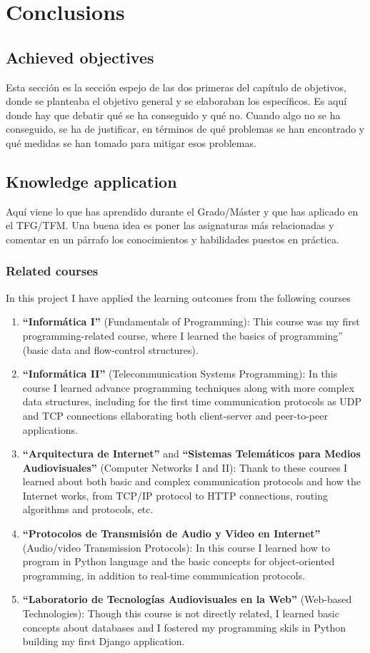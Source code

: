 \documentclass[a4paper, 12pt]{book}
\begin{document}
\chapter{Conclusions}
\label{sec:conclusions}
\section{Achieved objectives}
\label{sec:achieved-objectives}
Esta sección es la sección espejo de las dos primeras del capítulo de objetivos,
donde se planteaba el objetivo general y se elaboraban los específicos.
Es aquí donde hay que debatir qué se ha conseguido y qué no. Cuando algo no
se ha conseguido, se ha de justificar, en términos de qué problemas se han
encontrado y qué medidas se han tomado para mitigar esos problemas.
\section{Knowledge application}
\label{sec:knowledge-application}
Aquí viene lo que has aprendido durante el Grado/Máster y que has aplicado
en el TFG/TFM. Una buena idea es poner las asignaturas más relacionadas y
comentar en un párrafo los conocimientos y habilidades puestos en práctica.
\subsection{Related courses}
In this project I have applied the learning outcomes from the following courses
\begin{enumerate}
  \item \textbf{``Informática I''} (Fundamentals of Programming): This course was my first programming-related course,
  where I learned the basics of programming'' (basic data and flow-control structures).
  \item \textbf{``Informática II''} (Telecommunication Systems Programming): In this course I learned advance programming
  techniques along with more complex data structures, including for the first time communication protocols as UDP and TCP connections
  ellaborating both client-server and peer-to-peer applications.
  \item \textbf{``Arquitectura de Internet''} and \textbf{``Sistemas Telemáticos para Medios Audiovisuales''} (Computer Networks I and II):
  Thank to these courses I learned about both basic and complex communication protocols and how the Internet works,
  from TCP/IP protocol to HTTP connections, routing algorithms and protocols, etc.
  \item \textbf{``Protocolos de Transmisión de Audio y Video en Internet''} (Audio/video Transmission Protocols):
  In this course I learned how to program in Python language and the basic concepts for object-oriented programming, in
  addition to real-time communication protocols.
  \item \textbf{``Laboratorio de Tecnologías Audiovisuales en la Web''} (Web-based Technologies): Though this course is not directly
  related, I learned basic concepts about databases and I fostered my programming skils in Python building my first Django
  application.
\end{enumerate}
\end{document}
